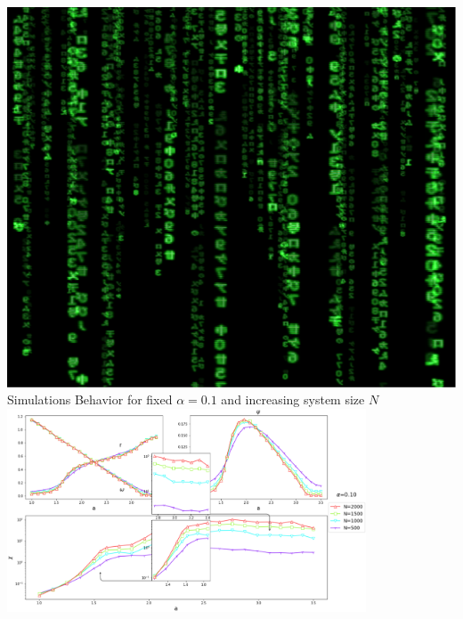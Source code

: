 \documentclass[serif,mathserif]{beamer}
\begin{document}
\begin{frame}{\includegraphics[height=0.06\textheight]{matrix.eps}\hspace{0.25cm} Simulations}
    \centering
    Behavior for fixed $\alpha=0.1$ and increasing system size $N$\\
    \vspace{0.25cm}
    \includegraphics[width=0.8\textwidth]{increasingN-alpha10.eps}
\end{frame}
\end{document}
